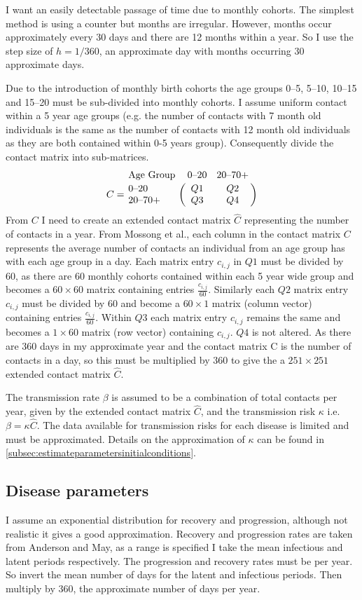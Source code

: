 \documentclass[a4paper,11pt] {scrartcl}
\begin{document}
I want an easily detectable passage of time due to monthly cohorts. The simplest method is using a counter but months are irregular. However, months occur approximately every $30$ days and there are 12 months within a year. So I use the step size of $h = 1/360$, an approximate day with months occurring 30 approximate days.

Due to the introduction of monthly birth cohorts the age groups 0--5, 5--10, 10--15 and 15--20 must be sub-divided into monthly cohorts. I assume uniform contact within a 5 year age groups (e.g. the number of contacts with 7 month old individuals is the same as the number of contacts with 12 month old individuals as they are both contained within 0-5 years group). Consequently divide the contact matrix into sub-matrices. 
\begin{equation*}
C = \bordermatrix{\text{Age Group}& 0\text{--}20 & 20\text{--}70+ \cr
0\text{--}20 & Q1 & Q2\cr
20\text{--}70+ & Q3 & Q4 \cr
}
\end{equation*}
From $C$ I need to create an extended contact matrix $\hat{C}$ representing the number of contacts in a year. From Mossong et al.\cite{mossong2008social}, each column in the contact matrix $C$ represents the average number of contacts an individual from an age group has with each age group in a day. Each matrix entry $c_{i,j}$ in $Q1$ must be divided by 60, as there are 60 monthly cohorts contained within each 5 year wide group and becomes a $60 \times 60$ matrix containing entries $\frac{c_{i,j}}{60}$. Similarly each $Q2$ matrix entry $c_{i,j}$ must be divided by 60 and become a $60 \times 1$ matrix (column vector) containing entries $\frac{c_{i,j}}{60}$. Within $Q3$ each matrix entry $c_{i,j}$ remains the same and becomes a $1 \times 60$ matrix (row vector) containing $c_{i,j}$. $Q4$ is not altered. As there are 360 days in my approximate year and the contact matrix C is the number of contacts in a day, so this must be multiplied by 360 to give the a $251 \times 251$ extended contact matrix $\hat{C}$.

The transmission rate $\beta$ is assumed to be a combination of total contacts per year, given by the extended contact matrix $\hat{C}$, and the transmission risk $\kappa$ i.e. $\beta = \kappa \hat{C}$. The data available for transmission risks for each disease is limited and must be approximated. Details on the approximation of $\kappa$ can be found in \autoref{subsec:estimateparametersinitialconditions}.

\subsection{Disease parameters}
\label{subsec:estimateparametersdisease}
I assume an exponential distribution for recovery and progression, although not realistic it gives a good approximation. Recovery and progression rates are taken from Anderson and May\cite{anderson1982directly}, as a range is specified I take the mean infectious and latent periods respectively. The progression and recovery rates must be per year. So invert the mean number of days for the latent and infectious periods. Then multiply by 360, the approximate number of days per year.
\end{document}
